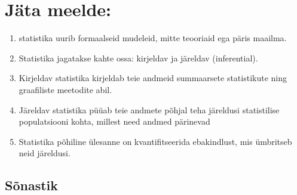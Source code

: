 \documentclass[]{book}
\begin{document}
\chapter{Jäta meelde:}\label{jata-meelde}

\begin{enumerate}
\def\labelenumi{\arabic{enumi}.}
\item
  statistika uurib formaalseid mudeleid, mitte teooriaid ega päris
  maailma.
\item
  Statistika jagatakse kahte ossa: kirjeldav ja järeldav (inferential).
\item
  Kirjeldav statistika kirjeldab teie andmeid summaarsete statistikute
  ning graafiliste meetodite abil.
\item
  Järeldav statistika püüab teie andmete põhjal teha järeldusi
  statistilise populatsiooni kohta, millest need andmed pärinevad
\item
  Statistika põhiline ülesanne on kvantifitseerida ebakindlust, mis
  ümbritseb neid järeldusi.
\end{enumerate}

\section{Sõnastik}\label{sonastik}
\end{document}
